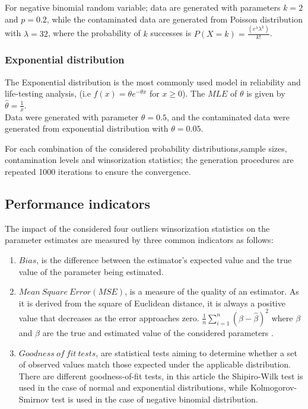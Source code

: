 \documentclass[notitlepage,12pt]{jedm}
\begin{document}
For negative binomial random variable; data are generated with
parameters \(k=2\) and \(p=0.2\), while the contaminated data are
generated from Poisson distribution with \(\lambda = 32\), where the
probability of \(k\) successes is
\(P(X=k) = \frac {(e^{\lambda} \lambda^k)} {k!}\).

\hypertarget{exponential-distribution}{%
\subsubsection{Exponential
distribution}\label{exponential-distribution}}

The Exponential distribution is the most commonly used model in
reliability and life-testing analysis, (i.e
\(f(x)=\theta e^{-\theta x}\) for \(x \geq 0\)). The \(MLE\) of
\(\theta\) is given by \(\hat{\theta}= \frac{1}{\bar{x}}\).\\
Data were generated with parameter \(\theta = 0.5\), and the
contaminated data were generated from exponential distribution with
\(\theta = 0.05\).

For each combination of the considered probability distributions,sample
sizes, contamination levels and winsorization statistics; the generation
procedures are repeated 1000 iterations to ensure the convergence.

\hypertarget{performance-indicators}{%
\subsection{Performance indicators}\label{performance-indicators}}

The impact of the considered four outliers winsorization statistics on
the parameter estimates are measured by three common indicators as
follows:

\begin{enumerate}
\def\labelenumi{\arabic{enumi}.}
\item
  \(Bias\), is the difference between the estimator's expected value and
  the true value of the parameter being estimated.
\item
  \(Mean \ Square\ Error (MSE)\), is a measure of the quality of an
  estimator. As it is derived from the square of Euclidean distance, it
  is always a positive value that decreases as the error approaches
  zero. \(\frac{1}{n} \sum_{i=1}^n (\beta - \hat{\beta})^2\) where
  \(\beta\) and \(\hat{\beta}\) are the true and estimated value of the
  considered parameters .
\item
  \(Goodness\ of\ fit\ tests\), are statistical tests aiming to
  determine whether a set of observed values match those expected under
  the applicable distribution. There are different goodness-of-fit
  tests, in this article the Shipiro-Wilk test is used in the case of
  normal and exponential distributions, while Kolmogorov-Smirnov test is
  used in the case of negative binomial distribution.
\end{enumerate}
\end{document}
